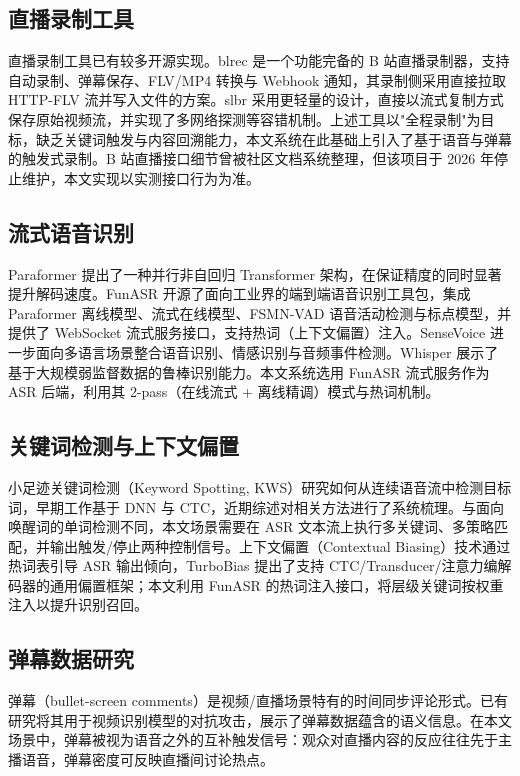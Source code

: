 \documentclass[UTF8,11pt,a4paper]{ctexart}
\begin{document}
\subsection{直播录制工具}

直播录制工具已有较多开源实现。blrec\cite{blrec} 是一个功能完备的 B 站直播录制器，支持自动录制、弹幕保存、FLV/MP4 转换与 Webhook 通知，其录制侧采用直接拉取 HTTP-FLV 流并写入文件的方案。slbr\cite{slbr} 采用更轻量的设计，直接以流式复制方式保存原始视频流，并实现了多网络探测等容错机制。上述工具以"全程录制"为目标，缺乏关键词触发与内容回溯能力，本文系统在此基础上引入了基于语音与弹幕的触发式录制。B 站直播接口细节曾被社区文档系统整理\cite{bili-api}，但该项目于 2026 年停止维护，本文实现以实测接口行为为准。

\subsection{流式语音识别}

Paraformer\cite{paraformer} 提出了一种并行非自回归 Transformer 架构，在保证精度的同时显著提升解码速度。FunASR\cite{funasr} 开源了面向工业界的端到端语音识别工具包，集成 Paraformer 离线模型、流式在线模型、FSMN-VAD 语音活动检测与标点模型，并提供了 WebSocket 流式服务接口，支持热词（上下文偏置）注入。SenseVoice\cite{funaudiollm} 进一步面向多语言场景整合语音识别、情感识别与音频事件检测。Whisper\cite{whisper} 展示了基于大规模弱监督数据的鲁棒识别能力。本文系统选用 FunASR 流式服务作为 ASR 后端，利用其 2-pass（在线流式 + 离线精调）模式与热词机制。

\subsection{关键词检测与上下文偏置}

小足迹关键词检测（Keyword Spotting, KWS）研究如何从连续语音流中检测目标词，早期工作基于 DNN 与 CTC\cite{kws-ctc}，近期综述对相关方法进行了系统梳理\cite{kws-survey}。与面向唤醒词的单词检测不同，本文场景需要在 ASR 文本流上执行多关键词、多策略匹配，并输出触发/停止两种控制信号。上下文偏置（Contextual Biasing）技术通过热词表引导 ASR 输出倾向，TurboBias\cite{turbobias} 提出了支持 CTC/Transducer/注意力编解码器的通用偏置框架；本文利用 FunASR 的热词注入接口，将层级关键词按权重注入以提升识别召回。

\subsection{弹幕数据研究}

弹幕（bullet-screen comments）是视频/直播场景特有的时间同步评论形式。已有研究将其用于视频识别模型的对抗攻击\cite{danmaku-attack}，展示了弹幕数据蕴含的语义信息。在本文场景中，弹幕被视为语音之外的互补触发信号：观众对直播内容的反应往往先于主播语音，弹幕密度可反映直播间讨论热点。
\end{document}
